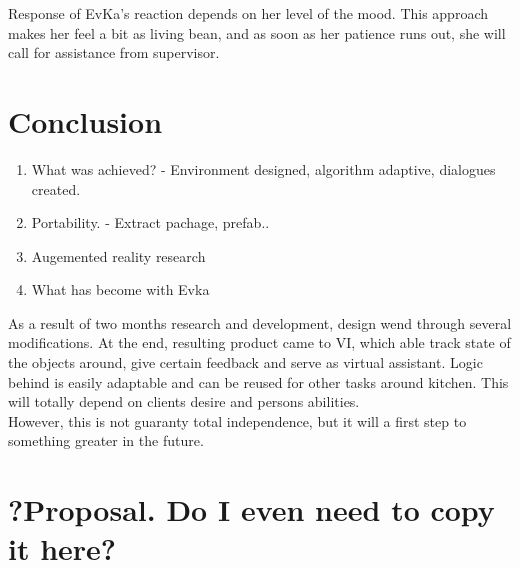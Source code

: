 \documentclass[18pt]{article}
\numberwithin{equation}{section} %
\numberwithin{figure}{section} %
\numberwithin{table}{section} %
\begin{document}
	Response of EvKa's reaction depends on her level of the mood. This approach makes her feel a bit as living bean, and as soon as her patience runs out, she will call for assistance from supervisor.
	
	
\section{Conclusion}
\begin{enumerate}
	\item What was achieved? - Environment designed, algorithm adaptive, dialogues created.
	\item Portability. - Extract pachage, prefab..
	\item Augemented reality research
	\item What has become with Evka
\end{enumerate}
	As a result of two months research and development, design wend through several modifications. At the end, resulting product came to VI, which able track state of the objects around, give certain feedback and serve as virtual assistant. Logic behind is easily adaptable and can be reused for other tasks around kitchen. This will totally depend on clients desire and persons abilities. \\
	
	However, this is not  guaranty total independence, but it will a first step to something greater in the future. \\
	

\section{?Proposal. Do I even need to copy it here?}	
	
	

\newpage
\begin{flushleft}



\end{flushleft}
\end{document}
